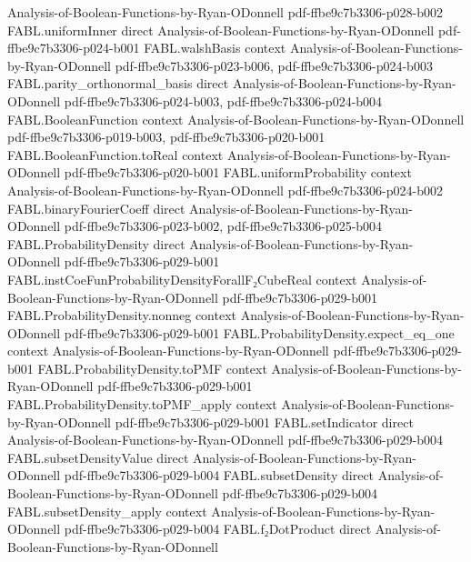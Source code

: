 \begin{theorem}
  {Analysis-of-Boolean-Functions-by-Ryan-ODonnell}
  {pdf-ffbe9c7b3306-p028-b002}
\proofstep
  {FABL.uniformInner}
  {direct}
  {Analysis-of-Boolean-Functions-by-Ryan-ODonnell}
  {pdf-ffbe9c7b3306-p024-b001}
\proofstep
  {FABL.walshBasis}
  {context}
  {Analysis-of-Boolean-Functions-by-Ryan-ODonnell}
  {pdf-ffbe9c7b3306-p023-b006,
    pdf-ffbe9c7b3306-p024-b003}
\proofstep
  {FABL.parity_orthonormal_basis}
  {direct}
  {Analysis-of-Boolean-Functions-by-Ryan-ODonnell}
  {pdf-ffbe9c7b3306-p024-b003,
    pdf-ffbe9c7b3306-p024-b004}
\proofstep
  {FABL.BooleanFunction}
  {context}
  {Analysis-of-Boolean-Functions-by-Ryan-ODonnell}
  {pdf-ffbe9c7b3306-p019-b003,
    pdf-ffbe9c7b3306-p020-b001}
\proofstep
  {FABL.BooleanFunction.toReal}
  {context}
  {Analysis-of-Boolean-Functions-by-Ryan-ODonnell}
  {pdf-ffbe9c7b3306-p020-b001}
\proofstep
  {FABL.uniformProbability}
  {context}
  {Analysis-of-Boolean-Functions-by-Ryan-ODonnell}
  {pdf-ffbe9c7b3306-p024-b002}
\proofstep
  {FABL.binaryFourierCoeff}
  {direct}
  {Analysis-of-Boolean-Functions-by-Ryan-ODonnell}
  {pdf-ffbe9c7b3306-p023-b002,
    pdf-ffbe9c7b3306-p025-b004}
\proofstep
  {FABL.ProbabilityDensity}
  {direct}
  {Analysis-of-Boolean-Functions-by-Ryan-ODonnell}
  {pdf-ffbe9c7b3306-p029-b001}
\proofstep
  {FABL.instCoeFunProbabilityDensityForallF₂CubeReal}
  {context}
  {Analysis-of-Boolean-Functions-by-Ryan-ODonnell}
  {pdf-ffbe9c7b3306-p029-b001}
\proofstep
  {FABL.ProbabilityDensity.nonneg}
  {context}
  {Analysis-of-Boolean-Functions-by-Ryan-ODonnell}
  {pdf-ffbe9c7b3306-p029-b001}
\proofstep
  {FABL.ProbabilityDensity.expect_eq_one}
  {context}
  {Analysis-of-Boolean-Functions-by-Ryan-ODonnell}
  {pdf-ffbe9c7b3306-p029-b001}
\proofstep
  {FABL.ProbabilityDensity.toPMF}
  {context}
  {Analysis-of-Boolean-Functions-by-Ryan-ODonnell}
  {pdf-ffbe9c7b3306-p029-b001}
\proofstep
  {FABL.ProbabilityDensity.toPMF_apply}
  {context}
  {Analysis-of-Boolean-Functions-by-Ryan-ODonnell}
  {pdf-ffbe9c7b3306-p029-b001}
\proofstep
  {FABL.setIndicator}
  {direct}
  {Analysis-of-Boolean-Functions-by-Ryan-ODonnell}
  {pdf-ffbe9c7b3306-p029-b004}
\proofstep
  {FABL.subsetDensityValue}
  {direct}
  {Analysis-of-Boolean-Functions-by-Ryan-ODonnell}
  {pdf-ffbe9c7b3306-p029-b004}
\proofstep
  {FABL.subsetDensity}
  {direct}
  {Analysis-of-Boolean-Functions-by-Ryan-ODonnell}
  {pdf-ffbe9c7b3306-p029-b004}
\proofstep
  {FABL.subsetDensity_apply}
  {context}
  {Analysis-of-Boolean-Functions-by-Ryan-ODonnell}
  {pdf-ffbe9c7b3306-p029-b004}
\proofstep
  {FABL.f₂DotProduct}
  {direct}
  {Analysis-of-Boolean-Functions-by-Ryan-ODonnell}

\end{theorem}
